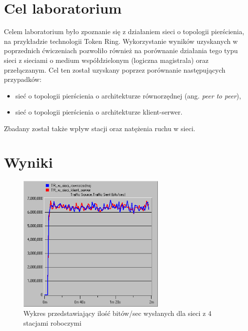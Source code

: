\documentclass{article}
\begin{document}

\newpage
\section{Cel laboratorium}

Celem laboratorium było zpoznanie się z działaniem sieci o topologii pierścienia, na przykładzie technologii Token Ring. Wykorzystanie wyników uzyskanych w poprzednich ćwiczeniach pozwoliło również na porównanie działania tego typu sieci z sieciami o medium współdzielonym (logiczna magistrala) oraz przełączanym. Cel ten został uzyskany poprzez porównanie następujących przypadków:
\begin{itemize}
\item sieć o topologii pierścienia o architekturze równorzędnej (ang. \textit{peer to peer}),
\item sieć o topologii pierścienia o architekturze klient-serwer.

\end{itemize}
Zbadany został także wpływ stacji oraz natężenia ruchu w sieci.
\section{Wyniki}

\begin{figure}[H]
  \centering
  \includegraphics[width=0.65\textwidth]{screens/4_sent.png}
 \caption{Wykres przedstawiający ilość bitów/sec wysłanych dla sieci z 4 stacjami roboczymi}
 \label{fig:4s}
\end{figure}
\end{document}
